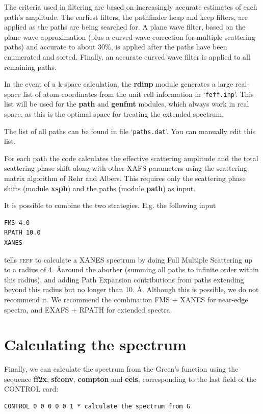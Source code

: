 \documentclass[11pt,oneside]{report} %
\newcommand{\program}[1]{\textsc{#1}}
\newcommand{\feff}{\program{feff}}
\newcommand{\file}[1]{`\texttt{#1}'}
\newcommand{\module}[1]{\textrm{\bf{#1}}}
\begin{document}
The criteria used in filtering are based on increasingly accurate
estimates of each path's amplitude. The earliest filters, the
pathfinder heap and keep filters, are applied as the paths are being
searched for. A plane wave filter, based on the plane wave approximation
(plus a curved wave correction for multiple-scattering paths) and
accurate to about 30\%, is applied after the paths have been enumerated
and sorted. Finally, an accurate curved wave filter is applied to
all remaining paths.

In the event of a k-space calculation, the \module{rdinp} module generates a
large real-space list of atom coordinates from the unit cell information in \file{feff.inp}.
This list will be used for the \module{path} and \module{genfmt} modules, which always work
in real space, as this is the optimal space for treating the extended spectrum.

The list of all paths can be found in file \file{paths.dat}.  You can manually edit this list.

For each path the code calculates the effective scattering amplitude
 and the total scattering phase
shift along with other XAFS parameters using the scattering matrix
algorithm of Rehr and Albers. This requires only the scattering phase shifts (module \module{xsph}) and
the paths (module \module{path}) as input.


It is possible to combine the two strategies.  E.g. the following input
\begin{verbatim}
FMS 4.0
RPATH 10.0
XANES
\end{verbatim}
tells {\feff} to calculate a XANES spectrum by doing Full Multiple Scattering up to a radius of 4. \AA around the aborber (summing all paths to infinite order within this radius), and adding Path Expansion contributions from paths extending beyond this radius but no longer than 10. \AA .  Although this is possible, we do not recommend it.  We recommend the combination FMS + XANES for near-edge spectra, and EXAFS + RPATH for extended spectra.



\section{Calculating the spectrum}
Finally, we can calculate the spectrum from the Green's function using the sequence \module{ff2x}, \module{sfconv}, \module{compton} and \module{eels}, corresponding to the last field of the CONTROL card:
\begin{verbatim}
CONTROL 0 0 0 0 0 1 * calculate the spectrum from G
\end{verbatim}
\end{document}
